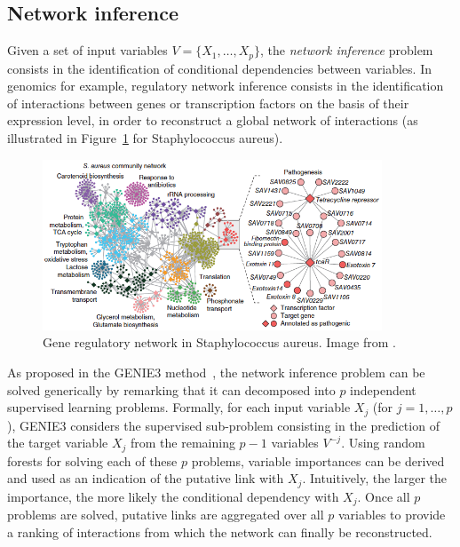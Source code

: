 \subsection{Network inference}

Given a set of input variables $V = \{X_1,\dots,X_p\}$, the \textit{network
inference} problem consists in the identification of conditional dependencies
between variables. In genomics for example, regulatory network inference
consists in the identification of interactions between genes or transcription
factors on the basis of their expression level, in order to reconstruct a global
network of interactions (as illustrated in Figure~\ref{fig:7:network} for
Staphylococcus aureus).

\begin{figure}
\centering
\includegraphics[width=0.9\textwidth]{figures/ch7_network.png}
\caption{Gene regulatory network in Staphylococcus aureus. Image from \citep{marbach:2012}.}
\label{fig:7:network}
\end{figure}

As proposed in the GENIE3 method~\citep{irrthum:2010}, the network inference
problem can be solved generically by remarking  that it can decomposed into $p$
independent supervised learning problems. Formally, for each input variable
$X_j$ (for $j=1,\dots,p$), GENIE3 considers the supervised sub-problem
consisting in the prediction of the target variable $X_j$ from the remaining
$p-1$ variables $V^{-j}$. Using random forests for solving each of these $p$
problems, variable importances can be derived and used as an indication of the
putative link with $X_j$. Intuitively, the larger the importance, the more
likely the conditional dependency with $X_j$. Once all $p$ problems are solved,
putative links are aggregated over all $p$ variables to provide a ranking of
interactions from which the network can finally be reconstructed.

